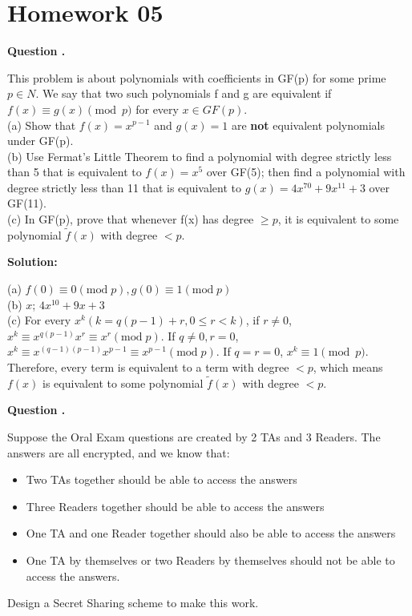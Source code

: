 \documentclass[12pt]{article}
\newcounter{questionnumber}
\newenvironment{question}[1][]{\stepcounter{questionnumber}\par\noindent\textbf{Question \thequestionnumber. #1}\par}{\par}
\newenvironment{solution}{\par\noindent\textbf{Solution:}\par}{\par\vspace{1em}}
\begin{document}
\section{Homework 05}
\begin{question}
    This problem is about polynomials with coefficients in GF(p) for some prime $p \in N$. We say that two such polynomials f and g are equivalent if $f(x) \equiv g(x)\pmod{p}$ for every $x \in GF(p)$.\\
    (a) Show that $f(x) = x^{p-1}$ and $g(x) = 1$ are \textbf{not} equivalent polynomials under GF(p).\\
    (b) Use Fermat's Little Theorem to find a polynomial with degree strictly less than 5 that is equivalent to $f(x) = x^{5}$ over GF(5); then find a polynomial with degree strictly less than 11 that is equivalent to $g(x) = 4x^{70} + 9x^{11} + 3$ over GF(11).\\
    (c) In GF(p), prove that whenever f(x) has degree $\geq p$, it is equivalent to some polynomial $\widetilde{f}(x)$ with degree $< p$.
\end{question}
\begin{solution}
    \noindent
    (a) $f\left( 0 \right) \equiv 0\left( \mathrm{mod}\;p \right) , g\left( 0 \right) \equiv 1\left( \mathrm{mod}\;p \right) $\\
    (b) $x$; $4x^{10}+9x+3$\\
    (c) For every $x^k(k=q(p-1)+r,0\leq r<k)$, if $r\neq 0$, $x^k\equiv x^{q\left( p-1 \right)}x^r\equiv x^r\left( \mathrm{mod}\;p \right) $.
    If $q\neq 0, r=0$, $x^k\equiv x^{\left( q-1 \right) \left( p-1 \right)}x^{p-1}\equiv x^{p-1}\left( \mathrm{mod}\;p \right) $.
    If $q=r=0$, $x^k\equiv 1\pmod{p}$. Therefore, every term is equivalent to a term with degree $<p$, which means $f(x)$ is equivalent to some polynomial $\widetilde{f}(x)$ with degree $< p$.
\end{solution}
\begin{question}
    Suppose the Oral Exam questions are created by 2 TAs and 3 Readers. The answers are all encrypted, and we know that:
    \begin{itemize}
        \item Two TAs together should be able to access the answers
        \item Three Readers together should be able to access the answers
        \item One TA and one Reader together should also be able to access the answers
        \item One TA by themselves or two Readers by themselves should not be able to access the answers.
    \end{itemize}

    Design a Secret Sharing scheme to make this work.
\end{question}
\end{document}
